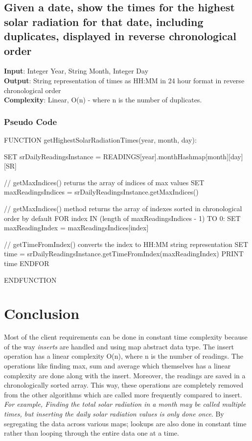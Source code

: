 \documentclass[12pt]{article}
\begin{document}
\subsection{Given a date, show the times for the highest solar radiation for that date, including duplicates, displayed in reverse chronological order}
\textbf{Input}: Integer Year, String Month, Integer Day \\
\textbf{Output}: String representation of times as HH:MM in 24 hour format in reverse chronological order\\
\textbf{Complexity}: Linear, O(n) - where n is the number of duplicates. \\
\subsubsection{Pseudo Code}
\begin{algorithm}[caption={Show the times for the highest solar radiation for a given date, including duplicates, displayed in reverse chronological order}, label=algo5]
FUNCTION getHighestSolarRadiationTimes(year, month, day):

	SET srDailyReadingsInstance = READINGS[year].monthHashmap[month][day][SR]

	// getMaxIndices() returns the array of indices of max values
	SET maxReadingsIndices = srDailyReadingsInstance.getMaxIndices()

	// getMaxIndices() method returns the array of indexes sorted in chronological order by default
	FOR index IN (length of maxReadingsIndices - 1) TO 0:
		SET maxReadingIndex = maxReadingsIndices[index]

		// getTimeFromIndex() converts the index to HH:MM string representation
		SET time = srDailyReadingsInstance.getTimeFromIndex(maxReadingIndex)
		PRINT time
	ENDFOR

ENDFUNCTION
\end{algorithm}
\section{Conclusion}
Most of the client requirements can be done in constant time complexity because of the way {\em inserts} are handled and using map abstract data type. The insert operation has a linear complexity O(n), where n is the number of readings. The operations like finding max, sum and average which themselves has a linear complexity are done along with the insert. Moreover, the readings are saved in a chronologically sorted array. This way, these operations are completely removed from the other algorithms which are called more frequently compared to insert. {\em For example, Finding the total solar radiation in a month may be called multiple times, but inserting the daily solar radiation values is only done once}. By segregating the data across various maps; lookups are also done in constant time rather than looping through the entire data one at a time.
\end{document}
